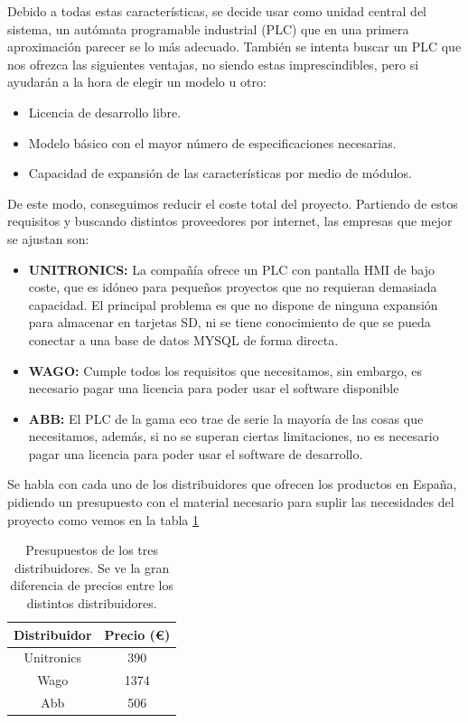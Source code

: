 Debido a todas estas características, se decide usar como unidad central del sistema, un autómata programable industrial (PLC) que en una primera aproximación parecer se lo más adecuado. También se intenta buscar un PLC que nos ofrezca las siguientes ventajas, no siendo estas imprescindibles, pero si ayudarán a la hora de elegir un modelo u otro:

\begin{itemize}
		\item{Licencia de desarrollo libre.}
		\item{Modelo básico con el mayor número de especificaciones necesarias.}
		\item{Capacidad de expansión de las características por medio de módulos.}
\end{itemize}

De este modo, conseguimos reducir el coste total del proyecto. Partiendo de estos requisitos y buscando distintos proveedores por internet, las empresas que mejor se ajustan son:

\begin{itemize}
		\item{\textbf{UNITRONICS:} La compañía ofrece un PLC con pantalla HMI de bajo coste, que es idóneo para pequeños proyectos que no requieran demasiada capacidad. El principal problema es que no dispone de ninguna expansión para almacenar en tarjetas SD, ni se tiene conocimiento de que se pueda conectar a una base de datos MYSQL de forma directa.}
		\item{\textbf{WAGO:} Cumple todos los requisitos que necesitamos, sin embargo, es necesario pagar una licencia para poder usar el software disponible}
		\item{\textbf{ABB:} El PLC de la gama eco trae de serie la mayoría de las cosas que necesitamos, además, si no se superan ciertas limitaciones, no es necesario pagar una licencia para poder usar el software de desarrollo.}
\end{itemize}

Se habla con cada uno de los distribuidores que ofrecen los productos en España, pidiendo un presupuesto con el material necesario para suplir las necesidades del proyecto como vemos en la tabla \ref{tab:presupuestos}

\begin{table}[H]
	\centering
	\begin{tabular}{cc}
		{\bf Distribuidor} & {\bf Precio (\euro{})} \\ \hline
		Unitronics         & 390              \\
		Wago               & 1374             \\
		Abb                & 506              \\
	\end{tabular}
	\caption[Presupuesto de los tres distribuidores]{Presupuestos de los tres distribuidores. Se ve la gran diferencia de precios entre los distintos distribuidores.}
	\label{tab:presupuestos}
\end{table}

